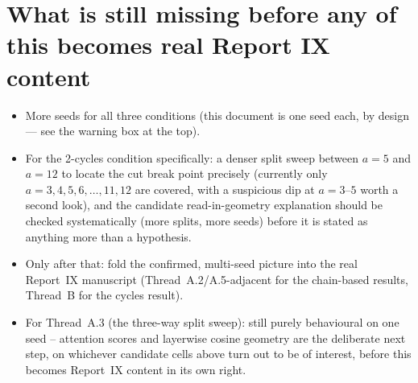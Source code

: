 \documentclass[11pt,a4paper]{article}
\begin{document}
\section*{What is still missing before any of this becomes real Report IX content}
\begin{itemize}
  \item More seeds for all three conditions (this document is one seed each, by design --- see
        the warning box at the top).
  \item For the 2-cycles condition specifically: a denser split sweep between $a=5$ and $a=12$
        to locate the cut break point precisely (currently only $a=3,4,5,6,\ldots,11,12$ are
        covered, with a suspicious dip at $a=3$--$5$ worth a second look), and the candidate
        read-in-geometry explanation should be checked systematically (more splits, more seeds)
        before it is stated as anything more than a hypothesis.
  \item Only after that: fold the confirmed, multi-seed picture into the real Report~IX
        manuscript (Thread~A.2/A.5-adjacent for the chain-based results, Thread~B for the cycles
        result).
  \item For Thread~A.3 (the three-way split sweep): still purely behavioural on one seed --
        attention scores and layerwise cosine geometry are the deliberate next step, on
        whichever candidate cells above turn out to be of interest, before this becomes
        Report~IX content in its own right.
\end{itemize}
\end{document}
